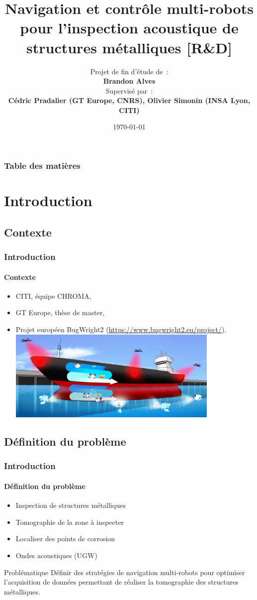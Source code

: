 \documentclass{beamer}
\title[Projet de Fin d'Étude]{Navigation et contrôle multi-robots pour l'inspection acoustique de structures métalliques [R\&D]}
\author[Brandon Alves]{
	Projet de fin d'étude de : \\
	\textbf{Brandon Alves} \\
	\vspace*{.25cm}
	\footnotesize Supervisé par : \\
	\textbf{Cédric Pradalier (GT Europe, CNRS), Olivier Simonin (INSA Lyon, CITI)}
}
\institute[INSA Lyon, CITI]{INSA Lyon, Laboratoire CITI, équipe CHROMA (INSA \& INRIA)}
\date{\today}
\begin{document}
	\begin{frame}
		\titlepage
	\end{frame}
	\begin{frame}[shrink=0]
		\frametitle{Table des matières}
		\tableofcontents
	\end{frame}
	\section{Introduction}
		\subsection*{Contexte}
			\begin{frame}
				\frametitle{Introduction}
				\framesubtitle{Contexte}
				\begin{itemize}
					\item CITI, équipe CHROMA,
					\item GT Europe, thèse de master,
					\item Projet européen BugWright2 (\url{https://www.bugwright2.eu/project/}).
					\includegraphics[width=0.8\textwidth]{graphics/Concept-Cartoon-NJ3-e1582812224528.jpg}
				\end{itemize}
			\end{frame}
		\subsection*{Définition du problème}
			\begin{frame}
				\frametitle{Introduction}
				\framesubtitle{Définition du problème}
				\begin{itemize}
					\item Inspection de structures métalliques
					\item Tomographie de la zone à inspecter
					\item Localiser des points de corrosion
					\item Ondes acoustiques (UGW)
				\end{itemize}
				\begin{block}{Problématique}
					Définir des stratégies de navigation multi-robots pour optimiser l'acquisition de données permettant de réaliser la tomographie des structures métalliques.
				\end{block}
			\end{frame}
\end{document}
